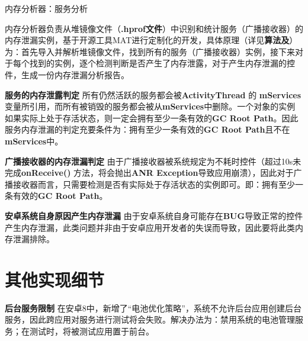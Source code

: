 \begin{algorithm}
	\caption{内存分析器：服务分析}
	\label{alg:memory analyser:receiver}
	\begin{algorithmic}[1]
					\ELSE
					\ENDIF
				\ENDIF
			\ENDIF
		\ENDFOR
	\end{algorithmic}
\end{algorithm}

内存分析器负责从堆镜像文件（\textbf{.hprof文件}）中识别和统计服务（广播接收器）的内存泄漏实例，基于开源工具MAT\cite{mat}进行定制化的开发，具体原理（详见\textbf{算法\redbf{\ref{alg:memory analyser:service}}及\redbf{\ref{alg:memory analyser:receiver}}}）为：首先导入并解析堆镜像文件，找到所有的服务（广播接收器）实例，接下来对于每个找到的实例，逐个检测判断是否产生了内存泄露，对于产生内存泄漏的控件，生成一份内存泄漏分析报告。

\textbf{服务的内存泄露判定 } 所有仍然活跃的服务都会被\textbf{ActivityThread} 的 \textbf{mServices}变量所引用，而所有被销毁的服务都会被从\textbf{mServices}中删除。一个对象的实例如果实际上处于存活状态，则一定会拥有至少一条有效的\textbf{GC Root Path}。因此服务内存泄漏的判定充要条件为：拥有至少一条有效的\textbf{GC Root Path}且不在\textbf{mServices}中。

\textbf{广播接收器的内存泄漏判定 } 由于广播接收器被系统规定为不耗时控件（超过10s未完成\textbf{onReceive()} 方法，将会抛出\textbf{ANR Exception}导致应用崩溃），因此对于广播接收器而言，只需要检测是否有实际处于存活状态的实例即可。即：拥有至少一条有效的\textbf{GC Root Path}。

\textbf{安卓系统自身原因产生内存泄漏 } 由于安卓系统自身可能存在\textbf{BUG}导致正常的控件产生内存泄漏，此类问题并非由于安卓应用开发者的失误而导致，因此要将此类内存泄漏排除。

\section{其他实现细节}

\textbf{后台服务限制 }\cite{android-service-limit} 在安卓8中，新增了“电池优化策略”，系统不允许后台应用创建后台服务，因此跨应用对服务进行测试将会失败。解决办法为：禁用系统的电池管理服务；在测试时，将被测试应用置于前台。

